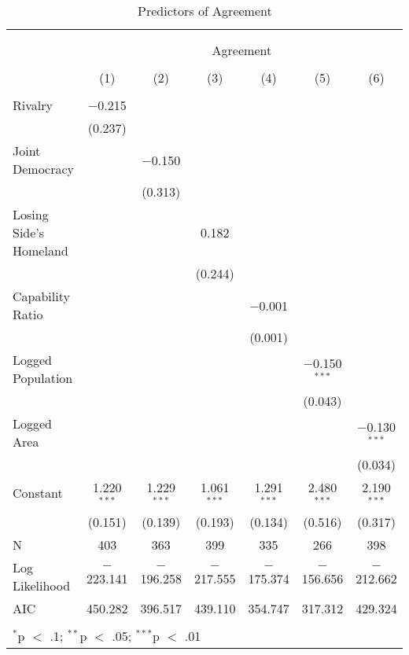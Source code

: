 \documentclass{article}
\begin{document}
\begin{table}[!htbp] \centering 
  \caption{Predictors of Agreement} 
  \label{} 
\begin{tabular}{@{\extracolsep{5pt}}lcccccc} 
\\[-1.8ex]\hline \\[-1.8ex] 
\\[-1.8ex] & \multicolumn{6}{c}{Agreement} \\ 
\\[-1.8ex] & (1) & (2) & (3) & (4) & (5) & (6)\\ 
\hline \\[-1.8ex] 
 Rivalry & $-$0.215 &  &  &  &  &  \\ 
  & (0.237) &  &  &  &  &  \\ 
  Joint Democracy &  & $-$0.150 &  &  &  &  \\ 
  &  & (0.313) &  &  &  &  \\ 
  Losing Side's Homeland &  &  & 0.182 &  &  &  \\ 
  &  &  & (0.244) &  &  &  \\ 
  Capability Ratio &  &  &  & $-$0.001 &  &  \\ 
  &  &  &  & (0.001) &  &  \\ 
  Logged Population &  &  &  &  & $-$0.150$^{***}$ &  \\ 
  &  &  &  &  & (0.043) &  \\ 
  Logged Area &  &  &  &  &  & $-$0.130$^{***}$ \\ 
  &  &  &  &  &  & (0.034) \\ 
  Constant & 1.220$^{***}$ & 1.229$^{***}$ & 1.061$^{***}$ & 1.291$^{***}$ & 2.480$^{***}$ & 2.190$^{***}$ \\ 
  & (0.151) & (0.139) & (0.193) & (0.134) & (0.516) & (0.317) \\ 
 N & 403 & 363 & 399 & 335 & 266 & 398 \\ 
Log Likelihood & $-$223.141 & $-$196.258 & $-$217.555 & $-$175.374 & $-$156.656 & $-$212.662 \\ 
AIC & 450.282 & 396.517 & 439.110 & 354.747 & 317.312 & 429.324 \\ 
\hline \\[-1.8ex] 
\multicolumn{7}{l}{$^{*}$p $<$ .1; $^{**}$p $<$ .05; $^{***}$p $<$ .01} \\ 
\end{tabular} 
\end{table} 
\end{document}
